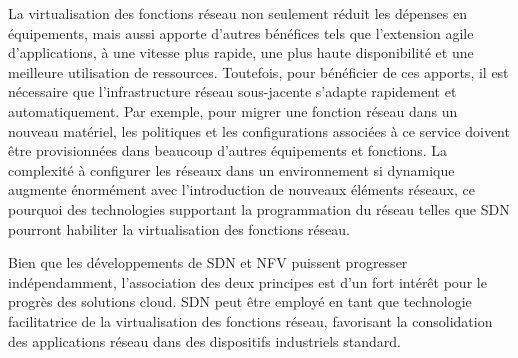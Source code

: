 

La virtualisation des fonctions réseau non seulement réduit les dépenses en équipements, mais aussi apporte d'autres bénéfices tels que l'extension agile d'applications, à une vitesse plus rapide, une plus haute disponibilité et une meilleure utilisation de ressources. Toutefois, pour bénéficier de ces apports, il est nécessaire que l'infrastructure réseau sous-jacente s'adapte rapidement et automatiquement. Par exemple, pour migrer une fonction réseau  dans un nouveau matériel, les politiques et les configurations associées à ce service doivent être provisionnées dans beaucoup d'autres équipements et fonctions. La complexité à configurer les réseaux dans un environnement si dynamique augmente énormément avec l'introduction de nouveaux éléments réseaux, ce pourquoi des technologies supportant la programmation du réseau telles que SDN pourront habiliter la virtualisation des fonctions réseau.


Bien que les développements de SDN et NFV puissent progresser indépendamment, l'association des deux principes est d'un fort intérêt pour le progrès des solutions cloud. SDN peut être employé en tant que technologie facilitatrice de la virtualisation des fonctions réseau, favorisant la consolidation des applications réseau dans des dispositifs industriels standard. \cite{OFSDNNFVintro} \cite{realTimeCloudNFV} \cite{IntelCloudEPC}


